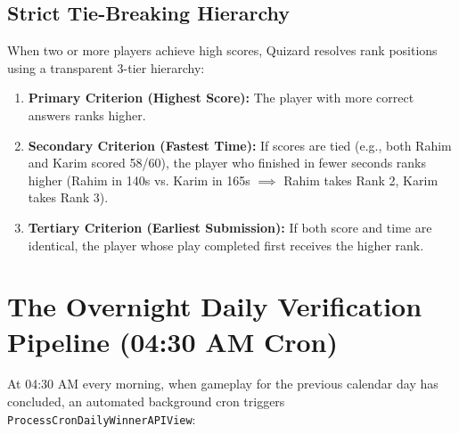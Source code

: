 \subsection{Strict Tie-Breaking Hierarchy}
When two or more players achieve high scores, Quizard resolves rank positions using a transparent 3-tier hierarchy:
\begin{enumerate}
    \item \textbf{Primary Criterion (Highest Score):} The player with more correct answers ranks higher.
    \item \textbf{Secondary Criterion (Fastest Time):} If scores are tied (e.g., both Rahim and Karim scored 58/60), the player who finished in fewer seconds ranks higher (Rahim in 140s vs. Karim in 165s $\implies$ Rahim takes Rank 2, Karim takes Rank 3).
    \item \textbf{Tertiary Criterion (Earliest Submission):} If both score and time are identical, the player whose play completed first receives the higher rank.
\end{enumerate}

\section{The Overnight Daily Verification Pipeline (04:30 AM Cron)}
At 04:30 AM every morning, when gameplay for the previous calendar day has concluded, an automated background cron triggers \texttt{ProcessCronDailyWinnerAPIView}:

